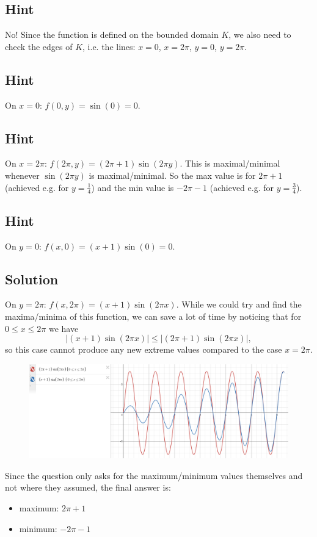 \documentclass[a4paper,10pt]{article}
\begin{document}
\subsection{Hint}
No! Since the function is defined on the bounded domain $K$, we also need to check the edges of $K$, i.e. the lines: $x=0$, $x=2\pi$, $y=0$, $y=2\pi$.

\subsection{Hint}
On $x=0$: $f(0,y) = \sin(0) = 0$.

\subsection{Hint}
On $x=2\pi$: $f(2\pi, y) = (2\pi+1)\sin(2\pi y)$. This is maximal/minimal whenever $\sin(2\pi y)$ is maximal/minimal. So the max value is for $2\pi+1$ (achieved e.g. for $y=\frac{1}{4}$) and the min value is $-2\pi-1$ (achieved e.g. for $y=\frac{3}{4}$).

\subsection{Hint}
On $y=0$: $f(x,0) = (x+1)\sin(0) = 0$.

\subsection{Solution}
On $y=2\pi$: $f(x, 2\pi) = (x+1)\sin(2\pi x)$. While we could try and find the maxima/minima of this function, we can save a lot of time by noticing that for $0 \leq x \leq 2\pi$ we have 
\[
    |(x+1)\sin(2\pi x)| \leq |(2\pi+1)\sin(2\pi x)|,
\]
so this case cannot produce any new extreme values compared to the case $x=2\pi$.

\begin{figure}[!ht]
    \centering
    \includegraphics[scale=0.4]{ex_11.png}
\end{figure}

Since the question only asks for the maximum/minimum values themselves and not where they assumed, the final answer is:
\begin{itemize}
    \item maximum: $2\pi+1$
    \item minimum: $-2\pi-1$
\end{itemize}
\end{document}
